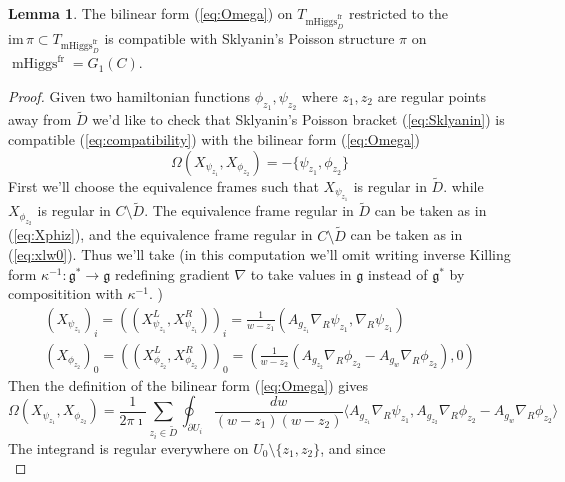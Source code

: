 \documentclass[11pt, oneside, reqno]{amsart}
\theoremstyle{definition} \newtheorem{definition}{Definition}[section]
\newtheorem{lemma}[definition]{Lemma}
\theoremstyle{definition} \newtheorem{remark}[definition]{Remark}
\theoremstyle{definition} \newtheorem{remarks}[definition]{Remarks}
\theoremstyle{definition} \newtheorem{question}[definition]{Question}
\theoremstyle{definition} \newtheorem*{note}{Note}
\theoremstyle{definition} \newtheorem{example}[definition]{Example}
\theoremstyle{definition} \newtheorem{examples}[definition]{Examples}
\renewcommand{\gg}{\mathfrak{g}}
\DeclareMathOperator{\mhiggs}{mHiggs}
\newcommand{\fr}{\mathrm{fr}}
\begin{document}
\begin{lemma}\label{lemma:OmegaPi}
  The bilinear form (\ref{eq:Omega}) on $T_{\mhiggs^{\fr}_{D}}$ 
restricted to the $\mathrm{im} \, \pi \subset T_{\mhiggs^{\fr}_{D}}$  is compatible
  with Sklyanin's Poisson structure $\pi$ on $\mhiggs^{\fr} = G_1(C)$.
\end{lemma}
\begin{proof}
  Given two hamiltonian functions $\phi_{z_1}, \psi_{z_2}$ where $z_1, z_2$ are regular
  points away from $\tilde D$ we'd like to check
  that Sklyanin's Poisson bracket (\ref{eq:Sklyanin})  
is compatible (\ref{eq:compatibility}) with the bilinear form  (\ref{eq:Omega})
\begin{equation}
  \Omega(X_{\psi_{z_1}}, X_{\phi_{z_2}})  = - \{\psi_{z_1}, \phi_{z_2}\}
\end{equation}
First we'll choose the equivalence frames such that $X_{\psi_{z_1}}$ is regular in $\tilde D$. 
while $X_{\phi_{z_2}}$ is regular in $C \setminus \tilde D$.
The equivalence frame regular in $\tilde D$ can be taken as in  (\ref{eq:Xphiz}),
and the equivalence frame regular in $C \setminus \tilde D$ can be taken
as in (\ref{eq:xlw0}). Thus we'll take (in this computation we'll omit writing inverse
Killing form $\kappa^{-1}: \gg^{*} \to \gg $ redefining gradient $\nabla$ to take values in $\gg$ instead of $\gg^{*}$
by compositition with $\kappa^{-1}$. )
\begin{equation}
  \begin{aligned}
    (X_{\psi_{z_1}})_{i} = ((X_{\psi_{z_1}}^{L}, X_{\psi_{z_1}}^{R}))_{i} =  \frac{1}{w - z_1} (A_{g_{z_1}} \nabla_R \psi_{z_1},   \nabla_{R} \psi_{z_1}) \\
    (X_{\phi_{z_2}})_{0} = ((X_{\phi_{z_2}}^{L}, X_{\phi_{z_2}}^{R}))_{0} = ( \frac{1}{w - z_2} ( A_{g_{z_2}} \nabla_R \phi_{z_2} - A_{g_{w}} \nabla_{R} \phi_{z_2}), 0) 
  \end{aligned}
\end{equation}
Then the definition of the bilinear form (\ref{eq:Omega}) gives
\begin{equation}
  \label{eq:pairing}
  \Omega(X_{\psi_{z_1}}, X_{\phi_{z_2}}) = \frac{1}{2 \pi \imath }
  \sum_{z_i \in \tilde D} \oint_{\partial U_i} \frac{dw }{(w - z_1)(w - z_2)} \langle A_{g_{z_1}} \nabla_{R} \psi_{z_1},
  A_{g_{z_2}} \nabla_{R} \phi_{z_2}  - A_{g_w} \nabla_{R} \phi_{z_2} \rangle
\end{equation}
The integrand is regular everywhere on $U_0 \setminus \{z_1, z_2\}$, and since
\begin{equation}

\end{equation}
\end{proof}
\end{document}
